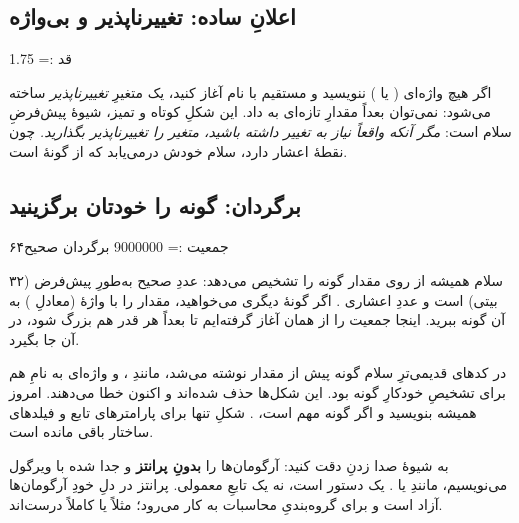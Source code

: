 \subsection{اعلانِ ساده: تغییرناپذیر و بی‌واژه}

\begin{salamfa}
قد := 1.75
\end{salamfa}

اگر هیچ واژه‌ای ( یا ) ننویسید و مستقیم با نام آغاز
کنید، یک متغیرِ \emph{تغییرناپذیر} ساخته می‌شود: نمی‌توان بعداً مقدارِ تازه‌ای
به  داد. این شکلِ کوتاه و تمیز، شیوهٔ پیش‌فرضِ سلام است: \emph{مگر آنکه
واقعاً نیاز به تغییر داشته باشید، متغیر را تغییرناپذیر بگذارید.} چون
 نقطهٔ اعشار دارد، سلام خودش درمی‌یابد که  از گونهٔ
 است.

\subsection{برگردان: گونه را خودتان برگزینید}

\begin{salamfa}
جمعیت := 9000000 برگردان صحیح۶۴
\end{salamfa}

سلام همیشه از روی مقدار گونه را تشخیص می‌دهد: عددِ صحیح به‌طورِ پیش‌فرض
 (۳۲ بیتی) است و عددِ اعشاری . اگر گونهٔ دیگری
می‌خواهید، مقدار را با واژهٔ  (معادلِ ) به آن گونه ببرید.
اینجا جمعیت را از همان آغاز  گرفته‌ایم تا بعداً هر قدر هم بزرگ شود،
در آن جا بگیرد.

\begin{tip}
در کدهای قدیمی‌ترِ سلام گونه پیش از مقدار نوشته می‌شد، مانندِ
، و واژه‌ای به نامِ  هم برای تشخیصِ خودکارِ
گونه بود. این شکل‌ها حذف شده‌اند و اکنون خطا می‌دهند. امروز همیشه
 بنویسید و اگر گونه مهم است، .
شکلِ  تنها برای پارامترهای تابع و فیلدهای ساختار باقی مانده است.
\end{tip}

\begin{note}
به شیوهٔ صدا زدنِ  دقت کنید: آرگومان‌ها را \textbf{بدونِ پرانتز} و
جدا شده با ویرگول می‌نویسیم، مانندِ  یا
.  یک دستور است، نه یک تابعِ معمولی.
پرانتز در دلِ خودِ آرگومان‌ها آزاد است و برای گروه‌بندیِ محاسبات به کار
می‌رود؛ مثلاً  یا  کاملاً درست‌اند.
\end{note}


